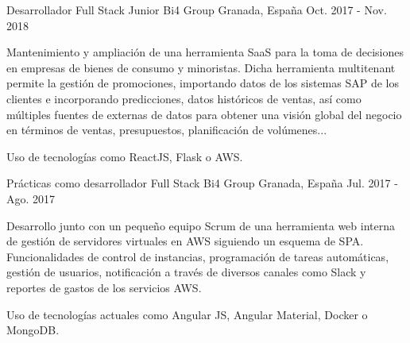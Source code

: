 


\begin{cventries}


\cventry
{Desarrollador Full Stack Junior} %
{Bi4 Group} %
{Granada, España} %
{Oct. 2017 - Nov. 2018} %
{ %
	\begin{cvitems}
		\item {Mantenimiento y ampliación de una herramienta SaaS para la toma de decisiones en empresas de bienes de consumo y minoristas. Dicha herramienta multitenant permite la gestión de promociones, importando datos de los sistemas SAP de los clientes e incorporando predicciones, datos históricos de ventas, así como múltiples fuentes de externas de datos para obtener una visión global del negocio en términos de ventas, presupuestos, planificación de volúmenes...}
		\item {Uso de tecnologías como ReactJS, Flask o AWS.}
	\end{cvitems}
}


\cventry
{Prácticas como desarrollador Full Stack } %
{Bi4 Group} %
{Granada, España} %
{Jul. 2017 - Ago. 2017} %
{ %
	\begin{cvitems}
		\item {Desarrollo junto con un pequeño equipo Scrum de una herramienta web interna de gestión de servidores virtuales en AWS siguiendo un esquema de SPA. Funcionalidades de control de instancias, programación de tareas automáticas, gestión de usuarios, notificación a través de diversos canales como Slack y reportes de gastos de los servicios AWS.}
		\item {Uso de tecnologías actuales como Angular JS, Angular Material, Docker o MongoDB.}
	\end{cvitems}
}

\end{cventries}